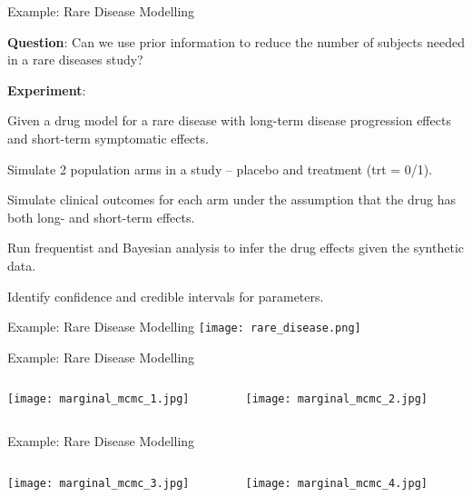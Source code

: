 \begin{frame}{Example: Rare Disease Modelling}
	\begin{vfilleditems}
		\item \textbf{Question}: Can we use prior information to reduce the number of subjects needed in a rare diseases study?
		\item \textbf{Experiment}:
		\begin{vfilleditems}
			\item Given a drug model for a rare disease with long-term disease progression effects and short-term symptomatic effects.
			\item Simulate 2 population arms in a study – placebo and treatment (trt = 0/1).
			\item Simulate clinical outcomes for each arm under the assumption that the drug has both long- and short-term effects.
			\item Run frequentist and Bayesian analysis to infer the drug effects given the synthetic data.
			\item Identify confidence and credible intervals for parameters.
		\end{vfilleditems}
	\end{vfilleditems}
\end{frame}

\begin{frame}{Example: Rare Disease Modelling}
	\centering
	\texttt{[image: rare\_disease.png]}
\end{frame}

\begin{frame}{Example: Rare Disease Modelling}
	\begin{columns}
		\begin{column}{0.5\textwidth}
			\centering
			\texttt{[image: marginal\_mcmc\_1.jpg]}
		\end{column}
		\begin{column}{0.5\textwidth}
			\centering
			\texttt{[image: marginal\_mcmc\_2.jpg]}
		\end{column}
	\end{columns}
\end{frame}

\begin{frame}{Example: Rare Disease Modelling}
	\begin{columns}
		\begin{column}{0.5\textwidth}
			\centering
			\texttt{[image: marginal\_mcmc\_3.jpg]}
		\end{column}
		\begin{column}{0.5\textwidth}
			\centering
			\texttt{[image: marginal\_mcmc\_4.jpg]}
		\end{column}
	\end{columns}
\end{frame}

